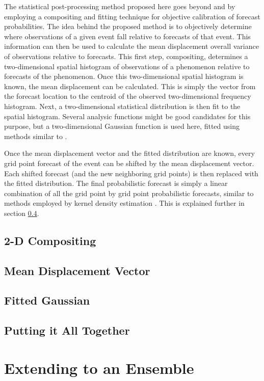 The statistical post-processing method proposed here goes beyond \cite{Theis2005} and \cite{Sobash2011} by employing a compositing and fitting technique for objective calibration of forecast probabilities. The idea behind the proposed method is to objectively determine where observations of a given event fall relative to forecasts of that event. This information can then be used to calculate the mean displacement overall variance of observations relative to forecasts. This first step, compositing, determines a two-dimensional spatial histogram of observations of a phenomenon relative to forecasts of the phenomenon. Once this two-dimensional spatial histogram is known, the mean displacement can be calculated. This is simply the vector from the forecast location to the centroid of the observed two-dimensional frequency histogram. Next, a two-dimensional statistical distribution is then fit to the spatial histogram. Several analysic functions might be good candidates for this purpose, but a two-dimensional Gaussian function is used here, fitted using methods similar to \cite{Lak2010}.

Once the mean displacement vector and the fitted distribution are known, every grid point forecast of the event can be shifted by the mean displacement vector. Each shifted forecast (and the new neighboring grid points) is then replaced with the fitted distribution. The final probabilistic forecast is simply a linear combination of all the grid point by grid point probabilistic forecasts, similar to methods employed by kernel density estimation \citep{KDE}. This is explained further in section \ref{kde}.




\subsection{2-D Compositing}
\label{compositing}




\subsection{Mean Displacement Vector}
\label{displacement}




\subsection{Fitted Gaussian}
\label{fitting}




\subsection{Putting it All Together}
\label{kde}




\section{Extending to an Ensemble}
\label{emethod}

